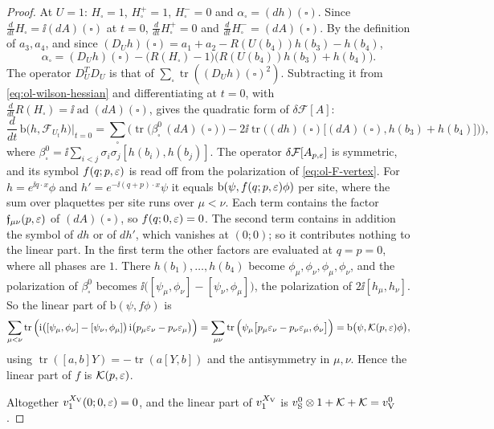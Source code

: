 \begin{proof}
At $U=1$: $H_\square=1$, $H^+_\square=1$, $H^-_\square=0$ and $\alpha_\square=(dh)(\square)$. Since $\frac d{dt}H_\square=\ii(dA)(\square)$ at $t=0$, $\frac d{dt}H^+_\square=0$ and $\frac d{dt}H^-_\square=(dA)(\square)$. By the definition of $a_3,a_4$, and since $(D_Uh)(\square)=a_1+a_2-R(U(b_4))h(b_3)-h(b_4)$,
\[
\alpha_\square=(D_Uh)(\square)-\big(R(H_\square)-1\big)\big(R(U(b_4))h(b_3)+h(b_4)\big).
\]
The operator $D_U^TD_U$ is that of $\sum_\square\operatorname{tr}((D_Uh)(\square)^2)$. Subtracting it from \eqref{eq:ol-wilson-hessian} and differentiating at $t=0$, with $\frac d{dt}R(H_\square)=\ii\operatorname{ad}(dA)(\square)$, gives the quadratic form of $\delta\mathcal F[A]$:
\begin{equation}\label{eq:ol-F-vertex}
\frac d{dt}\,\mathrm b\big(h,\mathcal F_{U_t}h\big)\Big|_{t=0}=\sum_\square\Big(\operatorname{tr}\big(\beta^0_\square\,(dA)(\square)\big)-2\ii\operatorname{tr}\big((dh)(\square)\big[(dA)(\square),h(b_3)+h(b_4)\big]\big)\Big),
\end{equation}
where $\beta^0_\square=\ii\sum_{i<j}\sigma_i\sigma_j[h(b_i),h(b_j)]$. The operator $\delta\mathcal F[A_{p,\varepsilon}]$ is symmetric, and its symbol $f(q;p,\varepsilon)$ is read off from the polarization of \eqref{eq:ol-F-vertex}. For $h=e^{\ii q\cdot x}\phi$ and $h'=e^{-\ii(q+p)\cdot x}\psi$ it equals $\mathrm b(\psi,f(q;p,\varepsilon)\phi)$ per site, where the sum over plaquettes per site runs over $\mu<\nu$. Each term contains the factor $\mathfrak f_{\mu\nu}(p,\varepsilon)$ of $(dA)(\square)$, so $f(q;0,\varepsilon)=0$. The second term contains in addition the symbol of $dh$ or of $dh'$, which vanishes at $(0;0)$; so it contributes nothing to the linear part. In the first term the other factors are evaluated at $q=p=0$, where all phases are $1$. There $h(b_1),\dots,h(b_4)$ become $\phi_\mu,\phi_\nu,\phi_\mu,\phi_\nu$, and the polarization of $\beta^0_\square$ becomes $\ii\big([\psi_\mu,\phi_\nu]-[\psi_\nu,\phi_\mu]\big)$, the polarization of $2\ii[h_\mu,h_\nu]$. So the linear part of $\mathrm b(\psi,f\phi)$ is
\[
\sum_{\mu<\nu}\operatorname{tr}\Big(\mathrm i\big([\psi_\mu,\phi_\nu]-[\psi_\nu,\phi_\mu]\big)\,\mathrm i\big(p_\mu\varepsilon_\nu-p_\nu\varepsilon_\mu\big)\Big)=\sum_{\mu\nu}\operatorname{tr}\Big(\psi_\mu\big[p_\mu\varepsilon_\nu-p_\nu\varepsilon_\mu,\phi_\nu\big]\Big)=\mathrm b\big(\psi,\mathcal K(p,\varepsilon)\phi\big),
\]
using $\operatorname{tr}([a,b]Y)=-\operatorname{tr}(a[Y,b])$ and the antisymmetry in $\mu,\nu$. Hence the linear part of $f$ is $\mathcal K(p,\varepsilon)$.

Altogether $v_1^{X_{\rm V}}(0;0,\varepsilon)=0$, and the linear part of $v_1^{X_{\rm V}}$ is $v^0_{\rm S}\otimes1+\mathcal K+\mathcal K=v^0_{\rm V}$.
\end{proof}

